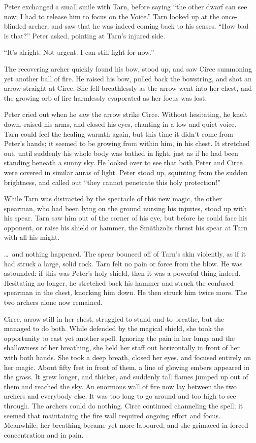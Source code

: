 Peter exchanged a small smile with Tarn, before saying ``the other dwarf can see now; I had to release him to focus on the Voice.''  Tarn looked up at the once-blinded archer, and saw that he was indeed coming back to his senses.  ``How bad is that?'' Peter asked, pointing at Tarn's injured side.

``It's alright.  Not urgent.  I can still fight for now.''

The recovering archer quickly found his bow, stood up, and saw Circe summoning yet another ball of fire.  He raised his bow, pulled back the bowstring, and shot an arrow straight at Circe.  She fell breathlessly as the arrow went into her chest, and the growing orb of fire harmlessly evaporated as her focus was lost.

Peter cried out when he saw the arrow strike Circe.  Without hesitating, he knelt down, raised his arms, and closed his eyes, chanting in a low and quiet voice.  Tarn could feel the healing warmth again, but this time it didn't come from Peter's hands; it seemed to be growing from within him, in his chest.  It stretched out, until suddenly his whole body was bathed in light, just as if he had been standing beneath a sunny sky.  He looked over to see that both Peter and Circe were covered in similar auras of light.  Peter stood up, squinting from the sudden brightness, and called out ``they cannot penetrate this holy protection!''

While Tarn was distracted by the spectacle of this new magic, the other spearman, who had been lying on the ground nursing his injuries, stood up with his spear.  Tarn saw him out of the corner of his eye, but before he could face his opponent, or raise his shield or hammer, the Sm\=athzolis thrust his spear at Tarn with all his might.

\ldots\ and nothing happened.  The spear bounced off of Tarn's skin violently, as if it had struck a large, solid rock.  Tarn felt no pain or force from the blow.  He was astounded: if this was Peter's holy shield, then it was a powerful thing indeed.  Hesitating no longer, he stretched back his hammer and struck the confused spearman in the chest, knocking him down.  He then struck him twice more.  The two archers alone now remained.

Circe, arrow still in her chest, struggled to stand and to breathe, but she managed to do both.  While defended by the magical shield, she took the opportunity to cast yet another spell.  Ignoring the pain in her lungs and the shallowness of her breathing, she held her staff out horizontally in front of her with both hands.  She took a deep breath, closed her eyes, and focused entirely on her magic.  About fifty feet in front of them, a line of glowing embers appeared in the grass.  It grew longer, and thicker, and suddenly tall flames jumped up out of them and reached the sky.  An enormous wall of fire now lay between the two archers and everybody else.  It was too long to go around and too high to see through.  The archers could do nothing.  Circe continued channeling the spell; it seemed that maintaining the fire wall required ongoing effort and focus.  Meanwhile, her breathing became yet more laboured, and she grimaced in forced concentration and in pain.

